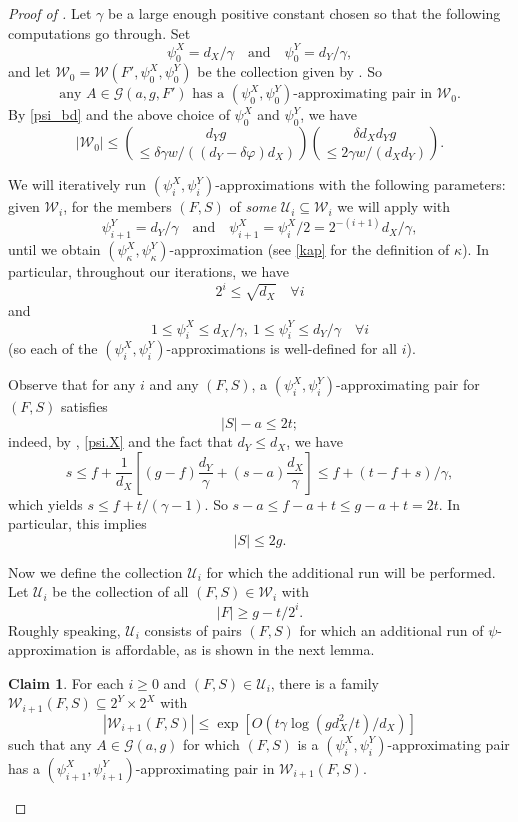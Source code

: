 \documentclass[a4paper]{amsart}
\theoremstyle{definition}
\newtheorem{claim}[thm]{Claim}
\newcommand{\cG}{\mathcal{G} }
\newcommand{\cU}{\mathcal{U} }
\newcommand{\cW}{\mathcal{W} }
\newcommand{\beq}[1]{\begin{equation}\label{#1}}
\newcommand{\enq}[0]{\end{equation}}
\newcommand{\sub}[0]{\subseteq}
\newcommand{\0}[0]{\emptyset}
\begin{document}
\begin{proof}[Proof of ]

Let $\gamma$ be a large enough positive constant chosen so that the following computations go through. Set
\beq{setup} \psi^X_0=d_X/\gamma \quad \text{and} \quad  \psi^Y_0=d_Y/\gamma, \enq
and let $\cW_0=\cW(F', \psi^X_0, \psi^Y_0)$ be the collection given by . So
\beq{container1} \text{any $A \in \cG(a,g,F')$ has a $(\psi^X_0, \psi^Y_0)$-approximating pair in $\cW_0$.}
\enq
By \eqref{psi_bd} and the above choice of $\psi^X_0$ and $\psi^Y_0$, we have
\beq{W0.bd} |\cW_0|\leq {d_Yg \choose \le \delta \gamma w/((d_Y-\delta \varphi)d_X)}{\delta d_X d_Y g \choose \le 2\gamma w/(d_Xd_Y)}. \enq

We will iteratively run $(\psi^X_i, \psi^Y_i)$-approximations with the following parameters: given $\cW_i$, for the members $(F,S)$ of \textit{some} $\cU_i \sub \cW_i$ we will apply  with
\beq{psi.ini} \psi^Y_{i+1}=d_Y/\gamma \quad \text{and} \quad \psi^X_{i+1}=\psi^X_i/2=2^{-(i+1)}d_X/\gamma,\enq
until we obtain $(\psi_\kappa^X, \psi_\kappa^Y)$-approximation (see \eqref{kap} for the definition of $\kappa$). In particular, throughout our iterations, we have
\beq{i.bd} 2^i \le \sqrt {d_X} \quad \forall i\enq
and
\beq{psi.X} 1 \le \psi^X_i\leq d_X/\gamma, \ 1\leq \psi^Y_i \le d_Y/\gamma \quad \forall i\enq
(so each of the $(\psi^X_i, \psi^Y_i)$-approximations is well-defined for all $i$).

Observe that for any $i$ and any $(F,S)$, a $(\psi_i^X, \psi_i^Y)$-approximating pair for $(F,S)$ satisfies
\beq{s.t.bd} |S|-a \le 2t; \enq
indeed, by , \eqref{psi.X} and the fact that $d_Y\leq d_X$, we have 
\[s \le f+\frac{1}{d_X}\left[(g-f)\frac{d_Y}{\gamma}+(s-a)\frac{d_X}{\gamma}\right]\le f+(t-f+s)/\gamma,\]
which yields $s \le f+t/(\gamma-1)$. So $s-a \le f-a+t \le g-a+t=2t.$ In particular, this implies
\beq{s.2g} |S|\leq 2g. \enq


Now we define the collection $\cU_i$ for which the additional run will be performed. Let $\cU_i$ be the collection of all $(F,S)\in \cW_i$ with 
\beq{case3.F} |F| \ge g-t/2^i.\enq
Roughly speaking, $\cU_i$ consists of pairs $(F,S)$ for which an additional run of $\psi$-approximation is affordable, as is shown in the next lemma. 

\begin{claim}\label{iteration.cost}
    For each $i\geq 0$ and $(F,S) \in \cU_i$, there is a family $\cW_{i+1}(F,S) \sub 2^Y \times 2^X$ with
    \[|\cW_{i+1}(F,S)|\le \exp\left[O(t\gamma \log (gd_X^2/t)/d_X)\right]\]
    such that any $A \in \cG(a,g)$ for which $(F,S)$ is a $(\psi^X_i, \psi^Y_i)$-approximating pair has a $(\psi^X_{i+1}, \psi^Y_{i+1})$-approximating pair in $\cW_{i+1}(F,S).$
\end{claim}


\end{proof}
\end{document}
